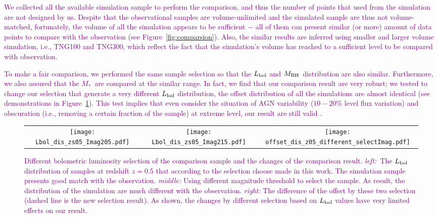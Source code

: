 \documentclass[twocolumn]{aastex631}
\newcommand{\red}[1]{\textcolor{purple}{#1}}
\def\smass{{$M_*$}}
\def\mbh{$M_{\rm BH}$}
\begin{document}
\red{We collected all the available simulation sample to perform the comparison, and thus the number of points that used from the simulation are not designed by us. Despite that the observational samples are volume-unlimited and the simulated sample are thus not volume-matched, fortunately, the volume of all the simulation appears to be sufficient $-$ all of them can present similar (or more) amount of data points to compare with the observation (see Figure~\ref{fig:comparsion}). Also, the similar results are inferred using smaller and larger volume simulation, i.e., TNG100 and TNG300, which reflect the fact that the simulation's volume has reached to a sufficient level to be compared with observation.}

\red{To make a fair comparison, we performed the same sample selection so that the $L_{\rm bol}$ and \mbh\ distribution are also similar. Furthermore, we also assured that the \smass\ are compared at the similar range. In fact, we find that our comparison result are very robust; we tested to change our selection that generate a very different $L_{\rm bol}$ distribution, the offset distribution of all the simulations are almost identical (see demonstrations in Figure~\ref{fig:offsets_nochange}). This test implies that even consider the situation of AGN variability ($10-20\%$ level flux variation) and obscuration (i.e., removing a certain fraction of the sample) at extreme level, our result are still valid .
}

\begin{figure*}
\centering
\begin{tabular}{c c c}
\hspace*{-0.4cm} 
{\texttt{[image: Lbol\_dis\_zs05\_Imag205.pdf]}}&
\hspace*{-0.4cm} 
{\texttt{[image: Lbol\_dis\_zs05\_Imag215.pdf]}}&
\hspace*{-0.4cm} 
{\texttt{[image: offset\_dis\_z05\_different\_selectImag.pdf]}}\\
\end{tabular}
\caption{\label{fig:offsets_nochange} 
\red{Different bolometric luminosity selection of the comparison sample and the changes of the comparison result. {\it left:}~The $L_{\rm bol}$ distribution of samples at redshift $z=0.5$ that according to the selection choose made in this work. The simulation sample presents good match with the observation. {\it middle:} Using different magnitude threshold to select the sample. As result, the distribution of the simulation are much different with the observation.  {\it right:} The difference of the offset by these two selection (dashed line is the new selection result). As shown, the changes by different selection based on $L_{\rm bol}$ values have very limited effects on our result.}
}
\end{figure*} 
\end{document}
